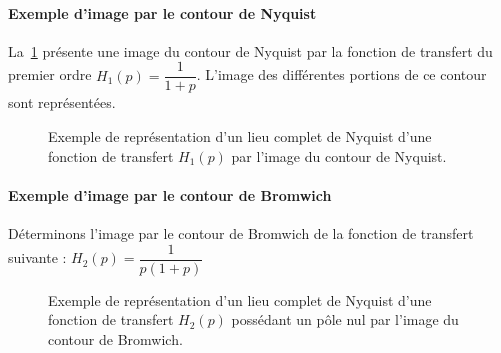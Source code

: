 \paragraph{Exemple d'image par le contour de Nyquist}
La~\cref{fig-nyquist_complet_image_exemple1} présente une image du contour
de Nyquist par la fonction de transfert du premier ordre 
$H_1(p)=\dfrac{1}{1+p}$. L'image des différentes portions de ce contour 
sont représentées.
\begin{figure}[!h]
    \centering
    
    \caption{Exemple de représentation d'un lieu complet de Nyquist d'une 
             fonction de transfert $H_1(p)$ par l'image du contour de 
             Nyquist. \label{fig-nyquist_complet_image_exemple1}}
\end{figure}
\paragraph{Exemple d'image par le contour de Bromwich}
Déterminons l'image par le contour de Bromwich de la fonction de transfert 
suivante : $H_2(p)=\dfrac{1}{p(1+p)}$
\begin{figure}[!h]
    \centering
    
    \caption{Exemple de représentation d'un lieu complet de Nyquist 
             d'une fonction de transfert $H_2(p)$ possédant un pôle nul par 
             l'image du contour de Bromwich. 
    \label{fig-bromwich_complet_image_exemple1} }
\end{figure}
\clearpage

